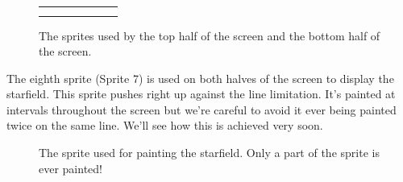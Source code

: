 \begin{figure}[H]
{\begin{adjustbox}{width=14cm,center}
\begin{tabular}{ccccccc}
{} & 
\makecell[l]{
	\begin{subfigure}{0.3\textwidth}
    \def\MULTICOLORONE{gray}
    \def\MULTICOLORTWO{white}
    \def\SPRITECOLOR{orange}
		
	\end{subfigure}
} & 
\makecell[l]{
	\begin{subfigure}{0.3\textwidth}
    \def\MULTICOLORONE{gray}
    \def\MULTICOLORTWO{white}
    \def\SPRITECOLOR{yellow}
		
	\end{subfigure}
} & 
\makecell[l]{
	\begin{subfigure}{0.3\textwidth}
    \def\MULTICOLORONE{gray}
    \def\MULTICOLORTWO{white}
    \def\SPRITECOLOR{green}
		
	\end{subfigure}
} & 
\makecell[l]{
	\begin{subfigure}{0.3\textwidth}
    \def\MULTICOLORONE{gray}
    \def\MULTICOLORTWO{white}
    \def\SPRITECOLOR{cyan}
		
	\end{subfigure}
} & 
\makecell[l]{
	\begin{subfigure}{0.3\textwidth}
    \def\MULTICOLORONE{gray}
    \def\MULTICOLORTWO{white}
    \def\SPRITECOLOR{pink}
		
	\end{subfigure}
} & 
\makecell[l]{
	\begin{subfigure}{0.3\textwidth}
    \def\MULTICOLORONE{gray}
    \def\MULTICOLORTWO{white}
    \def\SPRITECOLOR{purple}
		
	\end{subfigure}
} \\ 
        \addlinespace
        \bottomrule
      \end{tabular}
    \end{adjustbox}
  }\caption{The sprites used by the top half of the screen and the bottom half of the screen.}
\end{figure}

The eighth sprite (Sprite 7) is used on both halves of the screen to display the starfield. This
sprite pushes right up against the line limitation. It's painted at intervals throughout the screen
but we're careful to avoid it ever being painted twice on the same line. We'll see how this is
achieved very soon.


\begin{figure}[H]
  {
    \setlength{\tabcolsep}{1.0pt}
    \setlength\cmidrulewidth{\heavyrulewidth} %
    \begin{adjustbox}{width=4cm,center}
	\begin{subfigure}{0.3\textwidth}
    \def\MULTICOLORONE{gray}
    \def\MULTICOLORTWO{gray}
    \def\SPRITECOLOR{gray}
		
	\end{subfigure}
    \end{adjustbox}
  }\caption{The sprite used for painting the starfield. Only a part of the sprite is ever painted!}
\end{figure}

